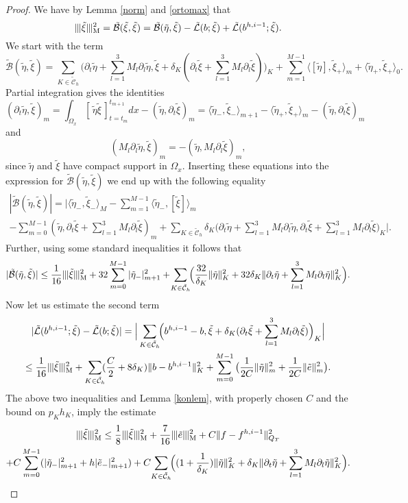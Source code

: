 \documentclass[reqno,a4paper]{amsart}
\theoremstyle{remark}
\numberwithin{equation}{section}
\newcommand{\Mnorm}[1]{|\mkern-1mu|\mkern-1mu|#1|\mkern-1mu|\mkern-1mu|_\mathrm{M}}
\newcommand{\sprod}[2]{\langle #1, #2 \rangle}
\def\d{\partial}
\def\Bt{\tilde{\mathcal{B}}}
\def\Lt{\tilde{\mathcal{L}}}
\def\et{\tilde{e}}
\def\etat{\tilde{\eta}}
\def\xit{\tilde{\xi}}
\def\sumK{\sum_{K\in\mathcal{\tilde{C}}_h}\!\!}
\begin{document}
\begin{proof}
We have by Lemma \ref{norm} and \eqref{ortomax} that
\[
\Mnorm{\xit}^2 = \Bt (\xit, \xit ) = \Bt(\etat,\xit)
- \Lt(b;\xit)+\Lt(b^{h,i-1};\xit).
\]
We start with the term
\[
\Bt(\etat,\xit)=\sumK \Big( \d_t\etat+\sum_{l=1}^3 M_l\d_l\etat,
\xit+\delta_K(\d_t\xit+\sum_{l=1}^3 M_l\d_l\xit) \Big)_K
+ \sum_{m=1}^{M-1} \sprod{[ \etat ]}{\xit_+}_m + \sprod{\etat_+}{\xit_+}_0.
\]
Partial integration gives the identities
\[
(\d_t\etat, \xit )_m = \int_{\Omega_x} [\, \etat \xit \, ]_{t=t_m}^{t_{m+1}} dx
- ( \etat , \d_t\xit )_m
= \sprod{\etat_-}{\xit_-}_{m+1} - \sprod{\etat_+}{\xit_+}_m - ( \etat, \d_t\xit )_m
\]
and
\[
(M_l\d_l\etat, \xit)_m = -(\etat, M_l\d_l\xit)_m ,
\]
since $ \etat $ and $ \xit $ have compact support in $ \Omega_x $.
Inserting these equations into the expression for $\Bt(\etat,\xit)$
we end up with the following equality
\begin{multline*}
|\Bt(\etat,\xit)| = |\sprod{\etat_-}{\xit_-}_M-\sum_{m=1}^{M-1}\sprod{\etat_-}{[\xit]}_m\\
-\sum_{m=0}^{M-1}(\etat,\d_t\xit+\sum_{l=1}^3 M_l\d_l\xit)_m
+\!\sumK\delta_K \Big( \d_t\etat+\sum_{l=1}^3 M_l\d_l\etat,\d_t\xit+\sum_{l=1}^3 M_l\d_l\xit \Big)_K| .
\end{multline*}
Further, using some standard inequalities it follows that
\[
|\Bt(\etat,\xit)| \leq \frac{1}{16}\Mnorm{\xit}^2
+32\sum_{m=0}^{M-1}|\etat_-|^2_{m+1}+\!\sumK\Big(\frac{32}{\delta_K}\|\etat\|^2_K
+32\delta_K\|\d_t\etat+\sum_{l=1}^3 M_l\d_l\etat\|^2_K\Big).
\]
Now let us estimate the second term
\begin{multline*}
|\Lt(b^{h,i-1};\xit)-\Lt(b;\xit) | = \Big|\sumK\Big(b^{h,i-1}-b,
\xit+\delta_K(\d_t\xit+\sum_{l=1}^3 M_l\d_l\xit)\Big)_K\Big|\\
\leq \frac{1}{16} \Mnorm{\xit}^2+\sumK(\frac{C}{2}+8\delta_K)\|b-b^{h,i-1}\|^2_K
+\sum_{m=0}^{M-1}\big(\frac{1}{2C}\|\etat\|^2_m+\frac{1}{2C}\|\et\|_m^2\big).
\end{multline*}
The above two inequalities and Lemma 
\ref{konlem}, with properly chosen $C$
and the bound on $p_K h_K$, imply the estimate
\begin{multline*}
\Mnorm{\xit}^2 \leq \frac{1}{8} \Mnorm{\xit}^2 + \frac{7}{16} \Mnorm{\et}^2
+C\|f-f^{h,i-1}\|^2_{Q_T}\\
+C\sum_{m=0}^{M-1}(|\etat_-|^2_{m+1}+h|\et_-|^2_{m+1})
+C\!\sumK\Big((1+\frac{1}{\delta_K})\|\etat\|^2_K
+\delta_K\|\d_t\etat+\sum_{l=1}^3 M_l\d_l\etat\|^2_K\Big).

\end{multline*}
\end{proof}
\end{document}
